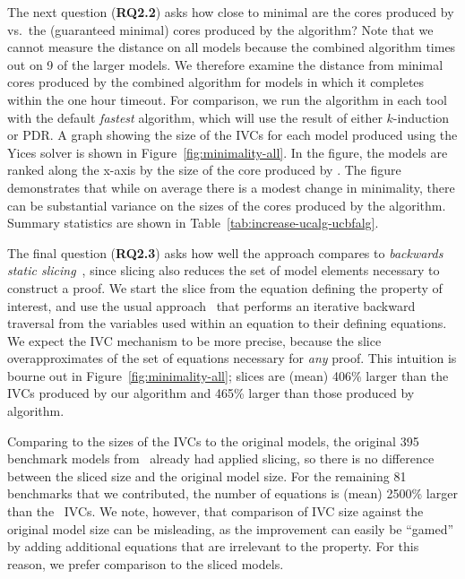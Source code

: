 


The next question (\textbf{RQ2.2}) asks how close to minimal are the
cores produced by \ucalg vs.\ the (guaranteed minimal) cores produced
by the \ucbfalg algorithm? Note that we cannot measure the distance on
all models because the combined algorithm times out on 9 of the larger
models. We therefore examine the distance from minimal cores produced
by the combined algorithm for models in which it completes within the
one hour timeout. For comparison, we run the \ucalg algorithm in each
tool with the default {\em fastest} algorithm, which will use the
result of either $k$-induction or PDR. A graph showing the size of the
IVCs for each model produced using the Yices solver is shown in
Figure~\ref{fig:minimality-all}. In the figure, the models are ranked
along the x-axis by the size of the core produced by \ucbfalg. The
figure demonstrates that while on average there is a modest change in
minimality, there can be substantial variance on the sizes of the
cores produced by the \ucalg algorithm. Summary statistics are shown
in Table~\ref{tab:increase-ucalg-ucbfalg}.


The final question (\textbf{RQ2.3}) asks how well the approach compares to {\em backwards static slicing}~\cite{Tip95asurvey}, since slicing also reduces the set of model elements necessary to construct a proof.  We start the slice from the equation defining the property of interest, and use the usual approach~\cite{Gaucher03:slicing} that performs an iterative backward traversal from the variables used within an equation to their defining equations.  We expect the IVC mechanism to be more precise, because the slice overapproximates of the set of equations necessary for {\em any} proof.  This intuition is bourne out in Figure~\ref{fig:minimality-all}; slices are (mean) 406\% larger than the IVCs produced by our \ucalg algorithm and 465\% larger than those produced by \ucbfalg algorithm.

Comparing to the sizes of the \ucalg IVCs to the original models, the original 395 benchmark models from~\cite{Hagen08:FMCAD} already had applied slicing, so there is no difference between the sliced size and the original model size.  For the remaining 81 benchmarks that we contributed, the number of equations is (mean) 2500\% larger than the \ucalg\ IVCs.  We note, however, that comparison of IVC size against the original model size can be misleading, as the improvement can easily be ``gamed'' by adding additional equations that are irrelevant to the property. For this reason, we prefer comparison to the sliced models.



